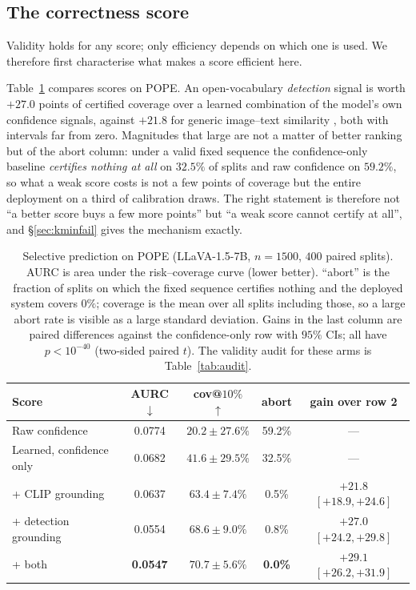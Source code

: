 \documentclass{article}
\theoremstyle{plain}
\theoremstyle{definition}
\theoremstyle{remark}
\begin{document}
\subsection{The correctness score}
\label{sec:score}

Validity holds for any score; only efficiency depends on which one is used. We therefore
first characterise what makes a score efficient here.

Table~\ref{tab:score} compares scores on POPE. An open-vocabulary \emph{detection} signal is
worth $+27.0$ points of certified coverage over a learned combination of the model's own
confidence signals, against $+21.8$ for generic image--text similarity \citep{clip}, both with
intervals far from zero. Magnitudes that large are not a matter of better ranking but of the
abort column: under a valid fixed sequence the confidence-only baseline \emph{certifies nothing
at all} on $32.5\%$ of splits and raw confidence on $59.2\%$, so what a weak score costs is not
a few points of coverage but the entire deployment on a third of calibration draws. The right
statement is therefore not ``a better score buys a few more points'' but ``a weak score cannot
certify at all'', and \S\ref{sec:kminfail} gives the mechanism exactly.

\begin{table}[t]
\centering
\caption{Selective prediction on POPE (LLaVA-1.5-7B, $n=1500$, $400$ paired splits). AURC is
area under the risk--coverage curve (lower better). ``abort'' is the fraction of splits on which
the fixed sequence certifies nothing and the deployed system covers $0\%$; coverage is the mean
over all splits including those, so a large abort rate is visible as a large standard deviation.
Gains in the last column are paired differences against the confidence-only row with $95\%$ CIs;
all have $p<10^{-40}$ (two-sided paired $t$). The validity audit for these arms is
Table~\ref{tab:audit}.}
\label{tab:score}
\small
\begin{tabular}{lcccc}
\toprule
Score & AURC $\downarrow$ & cov@$10\%$ $\uparrow$ & abort & gain over row 2\\
\midrule
Raw confidence                      & 0.0774 & $20.2\pm27.6\%$ & 59.2\% & ---\\
Learned, confidence only            & 0.0682 & $41.6\pm29.5\%$ & 32.5\% & ---\\
\quad + CLIP grounding \citep{clip} & 0.0637 & $63.4\pm7.4\%$  & \phantom{0}0.5\% & $+21.8$ $[+18.9,+24.6]$\\
\quad + detection grounding \citep{owlv2} & 0.0554 & $68.6\pm9.0\%$ & \phantom{0}0.8\% & $+27.0$ $[+24.2,+29.8]$\\
\quad + both                        & \textbf{0.0547} & $\mathbf{70.7\pm5.6\%}$ & \phantom{0}\textbf{0.0\%} & $+29.1$ $[+26.2,+31.9]$\\
\bottomrule
\end{tabular}
\end{table}
\end{document}
